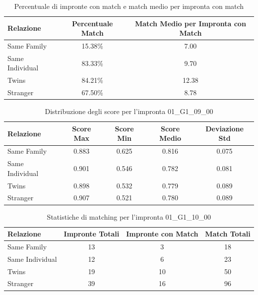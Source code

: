 \begin{table}[htbp]
\centering
\caption{Percentuale di impronte con match e match medio per impronta con match}
\label{tab:match_percentage_01_G1_09_00}
\begin{tabular}{|l|c|c|}
\hline
\textbf{Relazione} & \textbf{Percentuale Match} & \textbf{Match Medio per Impronta con Match} \\
\hline
Same Family & 15.38\% & 7.00 \\
\hline
Same Individual & 83.33\% & 9.70 \\
\hline
Twins & 84.21\% & 12.38 \\
\hline
Stranger & 67.50\% & 8.78 \\
\hline
\end{tabular}
\end{table}


\begin{table}[htbp]
\centering
\caption{Distribuzione degli score per l'impronta 01\_G1\_09\_00}
\label{tab:scores_01_G1_09_00}
\begin{tabular}{|l|c|c|c|c|}
\hline
\textbf{Relazione} & \textbf{Score Max} & \textbf{Score Min} & \textbf{Score Medio} & \textbf{Deviazione Std} \\
\hline
Same Family & 0.883 & 0.625 & 0.816 & 0.075 \\
\hline
Same Individual & 0.901 & 0.546 & 0.782 & 0.081 \\
\hline
Twins & 0.898 & 0.532 & 0.779 & 0.089 \\
\hline
Stranger & 0.907 & 0.521 & 0.780 & 0.089 \\
\hline
\end{tabular}
\end{table}


\begin{table}[htbp]
\centering
\caption{Statistiche di matching per l'impronta 01\_G1\_10\_00}
\label{tab:results_01_G1_10_00}
\begin{tabular}{|l|c|c|c|}
\hline
\textbf{Relazione} & \textbf{Impronte Totali} & \textbf{Impronte con Match} & \textbf{Match Totali} \\
\hline
Same Family & 13 & 3 & 18 \\
\hline
Same Individual & 12 & 6 & 23 \\
\hline
Twins & 19 & 10 & 50 \\
\hline
Stranger & 39 & 16 & 96 \\
\hline
\end{tabular}
\end{table}


